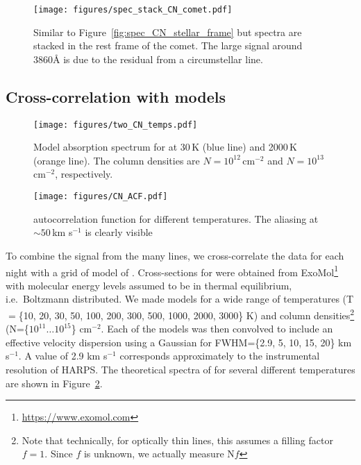 \documentclass{aa}
\newcommand{\kms}{km s$^{-1}$}
\begin{document}
\begin{figure}
    \begin{centering}
        \texttt{[image: figures/spec\_stack\_CN\_comet.pdf]}
        \caption{Similar to Figure~\ref{fig:spec_CN_stellar_frame} but spectra are stacked in the rest frame of the comet. The large signal around 3860\AA{} is due to the residual from a circumstellar  line.}
        \label{fig:spec_CN_comet_frame}
    \end{centering}
\end{figure}

\subsection{Cross-correlation with \texorpdfstring{}{CN} models}\label{sect:CCF}

\begin{figure}
    \begin{centering}
        \texttt{[image: figures/two\_CN\_temps.pdf]}
        \caption{Model absorption spectrum for  at 30\,K (blue line) and 2000\,K (orange line). The  column densities are $N=10^{12}$\,cm$^{-2}$ and $N=10^{13}$\,cm$^{-2}$, respectively. }
        \label{fig:CN_theory}
    \end{centering}
\end{figure}

\begin{figure}
    \begin{centering}
        \texttt{[image: figures/CN\_ACF.pdf]}
        \caption{ autocorrelation function for different temperatures. The aliasing at $\sim50$\,\kms{} is clearly visible}
        \label{fig:CN_ACF}
    \end{centering}
\end{figure}

To combine the signal from the many  lines, we cross-correlate the data for each night with a grid of model of .
%
Cross-sections for  were obtained from ExoMol\footnote{\url{https://www.exomol.com}} \citep{Tennyson12,Tennyson16,Brooke14} with molecular energy levels assumed to be in thermal equilibrium, i.e.\ Boltzmann distributed.
%
We made models for a wide range of temperatures (T$=$\{10, 20, 30, 50, 100, 200, 300, 500, 1000, 2000, 3000\} K) and column densities\footnote{Note that technically, for optically thin lines, this assumes a filling factor $f=1$.
%
Since $f$ is unknown, we actually measure N$f$} (N=\{$10^{11} \ldots 10^{15}$\} cm$^{-2}$.
%
Each of the models was then convolved to include an effective velocity dispersion using a Gaussian for FWHM=\{2.9, 5, 10, 15, 20\} \kms{}.
%
A value of 2.9 \kms{} corresponds approximately to the instrumental resolution of HARPS.
%
The theoretical spectra of  for several different temperatures are shown in Figure~\ref{fig:CN_theory}.
\end{document}
